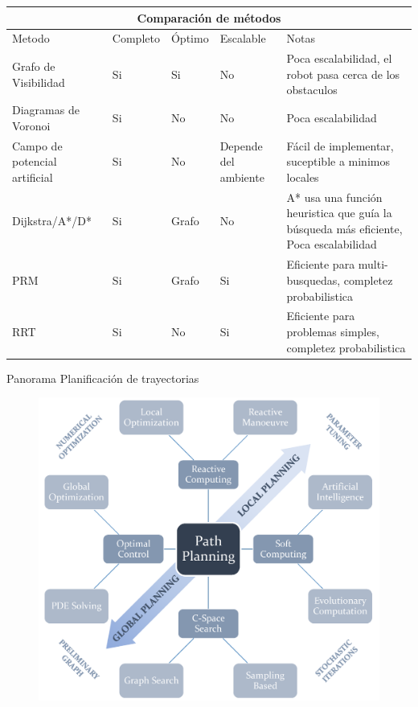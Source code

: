 \documentclass[
	12pt, %
	aspectratio=169, %
]{beamer}
\begin{document}
\begin{frame}{}
  \centering
  \begin{tabular}{ |p{1.5cm}||p{0.8cm}|p{0.8cm}|p{1.2cm}|p{5cm}|  }
    \hline
    \multicolumn{5}{|c|}{\tiny Comparaci\'{o}n de m\'{e}todos} \\
    \hline 
    \tiny Metodo& \tiny Completo & \tiny \'{O}ptimo& \tiny Escalable& \tiny Notas \\
    \hline
    \tiny Grafo de Visibilidad   & \tiny Si    & \tiny Si&   \tiny No& \tiny Poca escalabilidad, el robot pasa cerca de los obstaculos\\
    \hline
    \tiny Diagramas de Voronoi   & \tiny Si    & \tiny No&   \tiny No& \tiny Poca escalabilidad\\
    \hline
    \tiny Campo de potencial artificial & \tiny Si    & \tiny No&   \tiny Depende del ambiente& \tiny F\'{a}cil de implementar, suceptible a minimos locales\\
    \hline
    \tiny Dijkstra/A*/D* & \tiny Si    & \tiny Grafo&   \tiny No& \tiny A* usa una función heuristica que guía la búsqueda más eficiente, Poca escalabilidad\\
    \hline
    \tiny PRM   & \tiny Si    & \tiny Grafo&   \tiny Si&  \tiny Eficiente para multi-busquedas, completez probabilistica \\
    \hline
    \tiny RRT   & \tiny Si    & \tiny No&   \tiny Si&  \tiny Eficiente para problemas simples, completez probabilistica\\
    \hline
  \end{tabular}  
\end{frame}


\begin{frame}{Panorama Planificación de trayectorias}

  \begin{figure}
    \centering
    \includegraphics[scale=0.60]{panorama_planning}
    \caption[Caption for LOF]{\footnotemark}
  \end{figure}
  
\end{frame}
\end{document}
